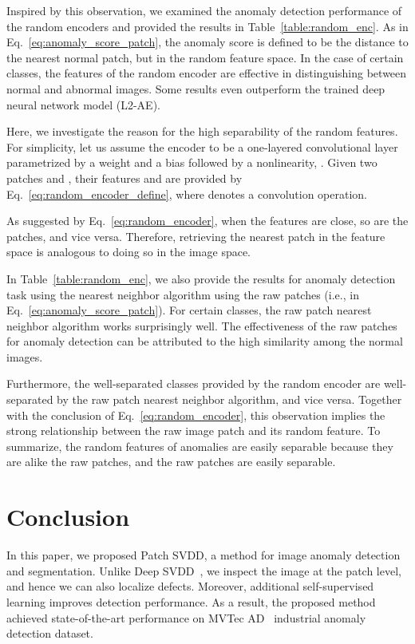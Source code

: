\documentclass[runningheads]{llncs}
\begin{document}
Inspired by this observation, we examined the anomaly detection performance of the random encoders and provided the results in Table~\ref{table:random_enc}.
As in Eq.~\ref{eq:anomaly_score_patch}, the anomaly score is defined to be the distance to the nearest normal patch, but in the random feature space.
In the case of certain classes, the features of the random encoder are effective in distinguishing between normal and abnormal images.
Some results even outperform the trained deep neural network model (L2-AE).

Here, we investigate the reason for the high separability of the random features.
For simplicity, let us assume the encoder to be a one-layered convolutional layer parametrized by a weight  and a bias  followed by a nonlinearity, .
Given two patches  and , their features  and  are provided by Eq.~\ref{eq:random_encoder_define}, where  denotes a convolution operation.



As suggested by Eq.~\ref{eq:random_encoder}, when the features are close, so are the patches, and vice versa.
Therefore, retrieving the nearest patch in the feature space is analogous to doing so in the image space.





In Table~\ref{table:random_enc}, we also provide the results for anomaly detection task using the nearest neighbor algorithm using the raw patches (i.e.,  in Eq.~\ref{eq:anomaly_score_patch}).
For certain classes, the raw patch nearest neighbor algorithm works surprisingly well.
The effectiveness of the raw patches for anomaly detection can be attributed to the high similarity among the normal images.

Furthermore, the well-separated classes provided by the random encoder are well-separated by the raw patch nearest neighbor algorithm, and vice versa.
Together with the conclusion of Eq.~\ref{eq:random_encoder}, this observation implies the strong relationship between the raw image patch and its random feature.
To summarize, the random features of anomalies are easily separable because they are alike the raw patches, and the raw patches are easily separable.
 \section{Conclusion}

In this paper, we proposed Patch SVDD, a method for image anomaly detection and segmentation.
Unlike Deep SVDD~\cite{deepSVDD}, we inspect the image at the patch level, and hence we can also localize defects.
Moreover, additional self-supervised learning improves detection performance.
As a result, the proposed method achieved state-of-the-art performance on MVTec AD~\cite{mvtecad} industrial anomaly detection dataset.
\end{document}
